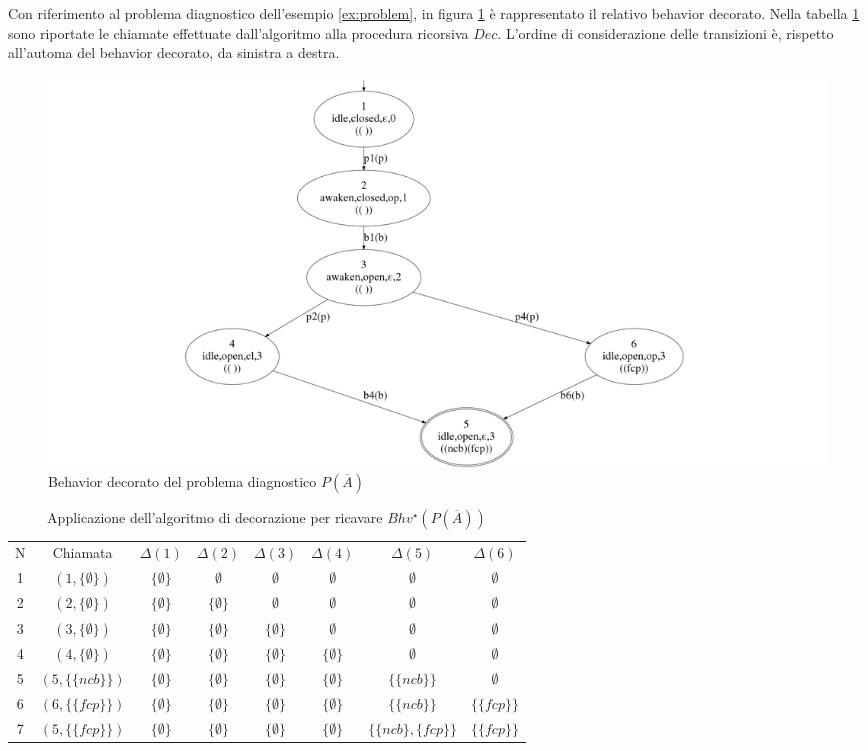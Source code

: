 \begin{ex}
Con riferimento al problema diagnostico dell'esempio \ref{ex:problem}, in figura \ref{fig:bhv_star} è rappresentato il relativo behavior decorato.
Nella tabella \ref{tab:decoration} sono riportate le chiamate effettuate dall'algoritmo alla procedura ricorsiva $Dec$. L'ordine di considerazione delle transizioni è, rispetto all'automa del behavior decorato, da sinistra a destra.
\end{ex}

\begin{figure}[htbp]
\centering
\includegraphics[scale=0.15]{./Img/sa/bhv_star.png}
\caption{Behavior decorato del problema diagnostico $P(\overline{A})$}
\label{fig:bhv_star}
\end{figure}

\begin{table}[htbp] 
\begin{tabularx}{\textwidth}{c c c c c c c c}
\hline
N & Chiamata & $\Delta(1)$ & $\Delta(2)$ & $\Delta(3)$ & $\Delta(4)$ & $\Delta(5)$ & $\Delta(6)$\\
1 & $(1,\{\emptyset\})$ & $\{\emptyset\}$  & $\emptyset$ & $\emptyset$ & $\emptyset$ & $\emptyset$ & $\emptyset$\\
2 & $(2,\{\emptyset\})$ & $\{\emptyset\}$  & $\{\emptyset\}$ & $\emptyset$ & $\emptyset$ & $\emptyset$ & $\emptyset$\\
3 & $(3,\{\emptyset\})$ & $\{\emptyset\}$  & $\{\emptyset\}$ & $\{\emptyset\}$ & $\emptyset$ & $\emptyset$ & $\emptyset$\\
4 & $(4,\{\emptyset\})$ & $\{\emptyset\}$  & $\{\emptyset\}$ & $\{\emptyset\}$ & $\{\emptyset\}$ & $\emptyset$ & $\emptyset$\\
5 & $(5,\{\{ncb\}\})$ & $\{\emptyset\}$  & $\{\emptyset\}$ & $\{\emptyset\}$ & $\{\emptyset\}$ & $\{\{ncb\}\}$ & $\emptyset$\\
6 & $(6,\{\{fcp\}\})$ & $\{\emptyset\}$  & $\{\emptyset\}$ & $\{\emptyset\}$ & $\{\emptyset\}$ & $\{\{ncb\}\}$ & $\{\{fcp\}\}$\\
7 & $(5,\{\{fcp\}\})$ & $\{\emptyset\}$  & $\{\emptyset\}$ & $\{\emptyset\}$ & $\{\emptyset\}$ & $\{\{ncb\},\{fcp\}\}$ & $\{\{fcp\}\}$\\
\hline
\end{tabularx}
\caption{Applicazione dell'algoritmo di decorazione per ricavare $Bhv^\star(P(\overline{A}))$}
\label{tab:decoration}
\end{table}

